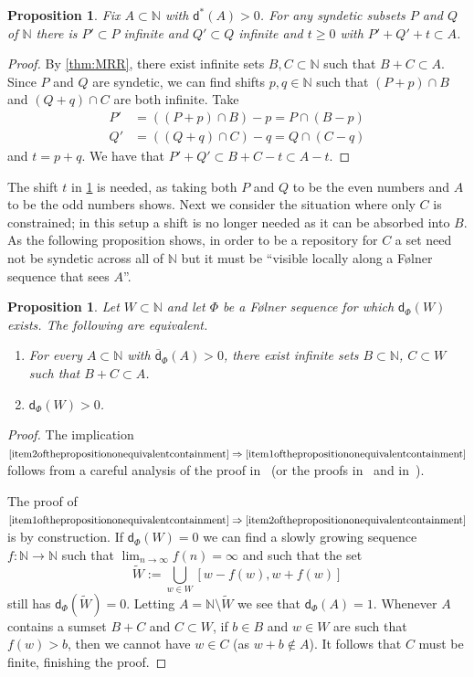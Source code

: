 \documentclass[10pt,dvipsnames]{article}
\newtheorem{proposition}[theorem]{Proposition}
\theoremstyle{definition}
\theoremstyle{plain}
\newcommand{\N}{\mathbb{N}}
\newcommand{\dens}{\mathsf{d}}
\newcommand{\udens}{\overline{\mathsf{d}}}
\newcommand{\ubdens}{\mathsf{d}^*}
\newcommand{\Folner}{F\o{}lner}
\begin{document}
\begin{proposition}
\label{prop_syndeticB+C}
Fix $A \subset \N$ with $\ubdens(A) > 0$.
For any syndetic subsets $P$ and $Q$ of $\N$ there is $P' \subset P$ infinite and $Q' \subset Q$ infinite and $t \ge 0$ with $P' + Q' + t \subset A$.
\end{proposition}
\begin{proof}
By \cref{thm:MRR}, there exist infinite sets $B,C\subset\N$ such that $B+C\subset A$.
Since $P$ and $Q$ are syndetic, we can find shifts $p,q\in\N$ such that $(P+p)\cap B$ and $(Q+q)\cap C$ are both infinite.
Take
\begin{align*}
P' &= ((P+p)\cap B)-p=P\cap(B-p) \\
Q' &= ((Q+q)\cap C)-q=Q\cap(C-q)
\end{align*} 
and $t=p+q$.
We have that  $P'+Q'\subset B+C-t\subset A-t$.
\end{proof}

The shift $t$  in \cref{prop_syndeticB+C} is needed, as taking both $P$ and $Q$ to be the even numbers and $A$ to be the odd numbers shows.
Next we consider the situation where only $C$ is constrained; in this setup a shift is no longer needed as it can be absorbed into $B$.
As the following proposition shows, in order to be a repository for $C$ a set need not be syndetic across all of $\N$ but it must be ``visible locally along a \Folner{} sequence that sees $A$''.

\begin{proposition}
\label{prop_B+Cindensity}
Let $W\subset\N$ and let $\Phi$ be a \Folner{} sequence for which $\dens_\Phi(W)$ exists. 
The following are equivalent.
\begin{enumerate}
\item
\label{item1ofthepropositiononequivalentcontainment}
For every $A\subset\N$ with $\udens_\Phi(A)>0$,  there exist infinite sets $B\subset\N$, $C\subset W$ such that $B+C\subset A$.
\item
\label{item2ofthepropositiononequivalentcontainment}
$\dens_\Phi(W)>0$.
\end{enumerate}
\end{proposition}
\begin{proof}
The implication
$
\eqref{item2ofthepropositiononequivalentcontainment}
\Rightarrow
\eqref{item1ofthepropositiononequivalentcontainment}
$
follows from a careful analysis of the proof in~\cite{MRR} (or the proofs in~\cite{Host} and in~\cite{KMRR}).

The proof of
$
\eqref{item1ofthepropositiononequivalentcontainment}
\Rightarrow
\eqref{item2ofthepropositiononequivalentcontainment}
$
is by construction.
If $\dens_\Phi(W)=0$ we can find a slowly growing sequence $f\colon \N\to\N$ such that  $\lim_{n\to\infty}  f(n)=\infty$ and such that the set
\[
\tilde W := \bigcup_{w\in W}[w-f(w),w+f(w)]
\]
still has $\dens_\Phi(\tilde W)=0$.
Letting $A=\N\setminus\tilde W$ we see that $\dens_\Phi(A)=1$.
Whenever $A$ contains a sumset $B+C$ and $C\subset W$, if $b\in B$ and $w\in W$ are such that $f(w)>b$, then we cannot have $w\in C$ (as $w+b\notin A$).
It follows that $C$ must be finite, finishing the proof.
\end{proof}
\end{document}

